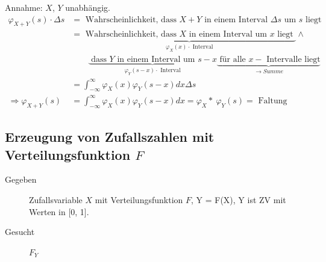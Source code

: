 \documentclass[10pt,a4paper]{scrartcl}
\newif\ifincludeExamples
\begin{document}
Annahme: $X$, $Y$ unabhängig.
\begin{align*}
\varphi_{X+Y}(s) \cdot \Delta s & = \text{ Wahrscheinlichkeit, dass } X+Y \text{ in einem Interval } \Delta s \text{ um } s \text{ liegt} \\
 & = \underbrace{\text{ Wahrscheinlichkeit, dass } X \text{ in einem Interval um } x \text{ liegt }}_{\varphi_X(x) \cdot \text{ Interval}} \wedge \\& \qquad\underbrace{\text{ dass } Y \text{ in einem Interval um } s-x}_{\varphi_Y(s-x)\cdot \text{ Interval}} \underbrace{\text{ für alle } x-\text{ Intervalle liegt}}_{\rightarrow Summe} \\
  &= \int_{-\infty}^\infty \varphi_X(x) \varphi_Y(s-x) dx \Delta s \\
  \Rightarrow \varphi_{X+Y}(s) & = \int_{-\infty}^\infty \varphi_X(x) \varphi_Y(s-x) dx = \varphi_X *\ \varphi_Y(s) = \text{ Faltung}
\end{align*}

\ifincludeExamples
Beispiel mit $X$, $Y$ gleichverteilt in [0,1]:
\begin{align*}
\varphi_X(x) & = \begin{cases} 0 & x \le 0 \\ 1 & 0 < x \le 1 \\ 0 & x > 1\end{cases}\\
\varphi_{Y}(s-x) & = \begin{cases}0 & s-x> 1 \Leftrightarrow x < s-1 \\ 1 & s-1\le x < s \\ 0 & x\ge s\end{cases} \\
\varphi_{X+Y} (s) & = \int_{-\infty}^\infty \varphi_X(x)\varphi_Y(s-x) dx & \varphi_X(x) \text{ ist immer 1 im relevanten Bereich}\\
                  & = \int_0^1 \varphi_Y(s-x) dx \\
\varphi_{X+Y}(s) & = \begin{cases} 0 & s < 0 \\ s & 0\le s <1 \\1-(s-1) = 2-s & 1 \le s \le 2\\ 0 & s > 2 \end{cases} \\
\end{align*}
\fi

\subsection{Erzeugung von Zufallszahlen mit Verteilungsfunktion $F$}
\begin{description}
\item[Gegeben] Zufallsvariable $X$ mit Verteilungsfunktion $F$, Y = F(X), Y ist ZV mit Werten in [0, 1].
\item[Gesucht] $F_Y$
\end{description}
\end{document}
